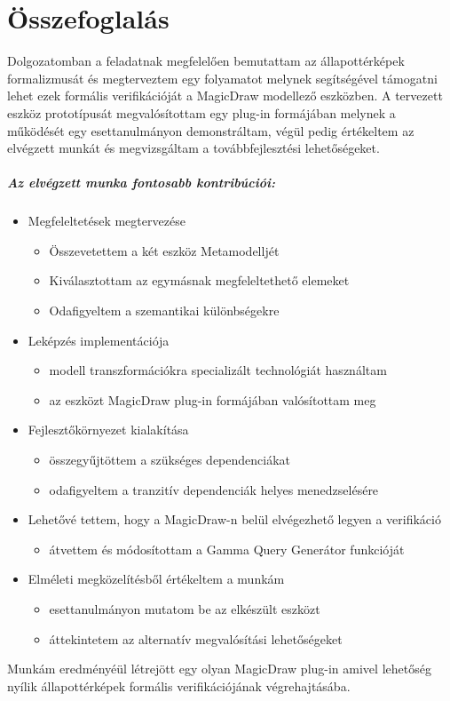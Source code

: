 \chapter{Összefoglalás}
\label{chap:osszefoglalas}
Dolgozatomban a feladatnak megfelelően bemutattam az állapottérképek formalizmusát és megterveztem egy folyamatot melynek segítségével támogatni lehet ezek formális verifikációját a MagicDraw modellező eszközben. A tervezett eszköz prototípusát megvalósítottam egy plug-in formájában melynek a működését egy esettanulmányon demonstráltam, végül pedig értékeltem az elvégzett munkát és megvizsgáltam a továbbfejlesztési lehetőségeket.

\paragraph{Az elvégzett munka fontosabb kontribúciói:}
\begin{itemize}
	\item Megfeleltetések megtervezése
	\begin{itemize}
		\item Összevetettem a két eszköz Metamodelljét
		\item Kiválasztottam az egymásnak megfeleltethető elemeket
		\item Odafigyeltem a szemantikai különbségekre
	\end{itemize}
	\item Leképzés implementációja
		\begin{itemize}
		\item modell transzformációkra specializált technológiát használtam
		\item az eszközt MagicDraw plug-in formájában valósítottam meg
	\end{itemize}
	\item Fejlesztőkörnyezet kialakítása
		\begin{itemize}
			\item összegyűjtöttem a szükséges dependenciákat
			\item odafigyeltem a tranzitív dependenciák helyes menedzselésére
		\end{itemize}
	\item Lehetővé tettem, hogy a MagicDraw-n belül elvégezhető legyen a verifikáció
			\begin{itemize}
			\item átvettem és módosítottam a Gamma Query Generátor funkcióját
		\end{itemize}

	\item Elméleti megközelítésből értékeltem a munkám
		\begin{itemize}
			\item esettanulmányon mutatom be az elkészült eszközt
			\item áttekintetem az alternatív megvalósítási lehetőségeket
		\end{itemize}	
\end{itemize}
Munkám eredményéül létrejött egy olyan MagicDraw plug-in amivel lehetőség nyílik állapottérképek formális verifikációjának végrehajtásába.

